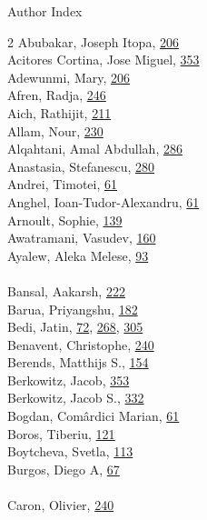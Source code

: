 \documentclass[11pt,oneside]{book}
\begin{document}
\begin{huge}
Author Index
\end{huge}
\vspace*{1em}
\begin{multicols}{2}
Abubakar, Joseph Itopa, \hyperlink{page.206}{206}\\
Acitores Cortina, Jose Miguel, \hyperlink{page.353}{353}\\
Adewunmi, Mary, \hyperlink{page.206}{206}\\
Afren, Radja, \hyperlink{page.246}{246}\\
Aich, Rathijit, \hyperlink{page.211}{211}\\
Allam, Nour, \hyperlink{page.230}{230}\\
Alqahtani, Amal Abdullah, \hyperlink{page.286}{286}\\
Anastasia, Stefanescu, \hyperlink{page.280}{280}\\
Andrei, Timotei, \hyperlink{page.61}{61}\\
Anghel, Ioan-Tudor-Alexandru, \hyperlink{page.61}{61}\\
Arnoult, Sophie, \hyperlink{page.139}{139}\\
Awatramani, Vasudev, \hyperlink{page.160}{160}\\
Ayalew, Aleka Melese, \hyperlink{page.93}{93}\\
\\ %
Bansal, Aakarsh, \hyperlink{page.222}{222}\\
Barua, Priyangshu, \hyperlink{page.182}{182}\\
Bedi, Jatin, \hyperlink{page.72}{72}, \hyperlink{page.268}{268}, \hyperlink{page.305}{305}\\
Benavent, Christophe, \hyperlink{page.240}{240}\\
Berends, Matthijs S., \hyperlink{page.154}{154}\\
Berkowitz, Jacob, \hyperlink{page.353}{353}\\
Berkowitz, Jacob S., \hyperlink{page.332}{332}\\
Bogdan, Comârdici Marian, \hyperlink{page.61}{61}\\
Boros, Tiberiu, \hyperlink{page.121}{121}\\
Boytcheva, Svetla, \hyperlink{page.113}{113}\\
Burgos, Diego A, \hyperlink{page.67}{67}\\
\\ %
Caron, Olivier, \hyperlink{page.240}{240}\\

\end{multicols}
\end{document}
